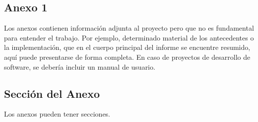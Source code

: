 \documentclass{prgrado}
\begin{document}


\begin{appendix}

\chapter{Anexo 1}

Los anexos contienen información adjunta al proyecto pero que no es fundamental
para entender el trabajo. Por ejemplo, determinado material de los antecedentes o la
implementación, que en el cuerpo principal del informe se encuentre resumido, aquí
puede presentarse de forma completa. En caso de proyectos de desarrollo de
software, se debería incluir un manual de usuario.

\section{Sección del Anexo}

Los anexos pueden tener secciones.

\end{appendix}


\end{document}
